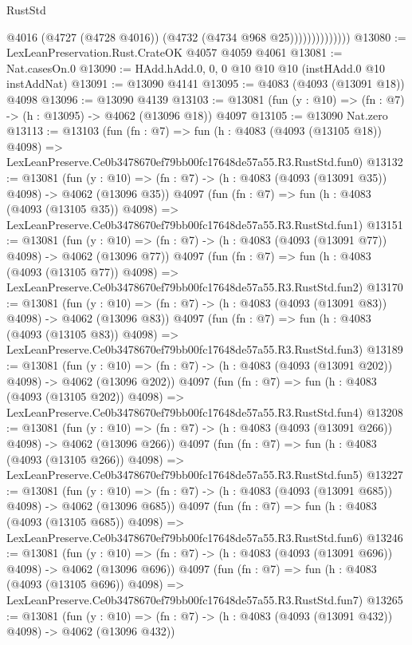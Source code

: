 \begin{lexlean}{RustStd}
\begin{coremodule}
                            @4016
                            (@4727 (@4728 @4016))
                            (@4732 (@4734 @968 @25))))))))))))))
@13080 := LexLeanPreservation.Rust.CrateOK @4057 @4059 @4061
@13081 := Nat.casesOn.{0}
@13090 := HAdd.hAdd.{0, 0, 0} @10 @10 @10 (instHAdd.{0} @10 instAddNat)
@13091 := @13090 @4141
@13095 := @4083 (@4093 (@13091 @18)) @4098
@13096 := @13090 @4139
@13103 := @13081 (fun (y : @10) => (fn : @7) -> (h : @13095) -> @4062 (@13096 @18)) @4097
@13105 := @13090 Nat.zero
@13113 := @13103
    (fun (fn : @7) =>
    fun (h : @4083 (@4093 (@13105 @18)) @4098) =>
    LexLeanPreserve.Ce0b3478670ef79bb00fc17648de57a55.R3.RustStd.fun0)
@13132 := @13081
    (fun (y : @10) => (fn : @7) -> (h : @4083 (@4093 (@13091 @35)) @4098) -> @4062 (@13096 @35))
    @4097
    (fun (fn : @7) =>
    fun (h : @4083 (@4093 (@13105 @35)) @4098) =>
    LexLeanPreserve.Ce0b3478670ef79bb00fc17648de57a55.R3.RustStd.fun1)
@13151 := @13081
    (fun (y : @10) => (fn : @7) -> (h : @4083 (@4093 (@13091 @77)) @4098) -> @4062 (@13096 @77))
    @4097
    (fun (fn : @7) =>
    fun (h : @4083 (@4093 (@13105 @77)) @4098) =>
    LexLeanPreserve.Ce0b3478670ef79bb00fc17648de57a55.R3.RustStd.fun2)
@13170 := @13081
    (fun (y : @10) => (fn : @7) -> (h : @4083 (@4093 (@13091 @83)) @4098) -> @4062 (@13096 @83))
    @4097
    (fun (fn : @7) =>
    fun (h : @4083 (@4093 (@13105 @83)) @4098) =>
    LexLeanPreserve.Ce0b3478670ef79bb00fc17648de57a55.R3.RustStd.fun3)
@13189 := @13081
    (fun (y : @10) => (fn : @7) -> (h : @4083 (@4093 (@13091 @202)) @4098) -> @4062 (@13096 @202))
    @4097
    (fun (fn : @7) =>
    fun (h : @4083 (@4093 (@13105 @202)) @4098) =>
    LexLeanPreserve.Ce0b3478670ef79bb00fc17648de57a55.R3.RustStd.fun4)
@13208 := @13081
    (fun (y : @10) => (fn : @7) -> (h : @4083 (@4093 (@13091 @266)) @4098) -> @4062 (@13096 @266))
    @4097
    (fun (fn : @7) =>
    fun (h : @4083 (@4093 (@13105 @266)) @4098) =>
    LexLeanPreserve.Ce0b3478670ef79bb00fc17648de57a55.R3.RustStd.fun5)
@13227 := @13081
    (fun (y : @10) => (fn : @7) -> (h : @4083 (@4093 (@13091 @685)) @4098) -> @4062 (@13096 @685))
    @4097
    (fun (fn : @7) =>
    fun (h : @4083 (@4093 (@13105 @685)) @4098) =>
    LexLeanPreserve.Ce0b3478670ef79bb00fc17648de57a55.R3.RustStd.fun6)
@13246 := @13081
    (fun (y : @10) => (fn : @7) -> (h : @4083 (@4093 (@13091 @696)) @4098) -> @4062 (@13096 @696))
    @4097
    (fun (fn : @7) =>
    fun (h : @4083 (@4093 (@13105 @696)) @4098) =>
    LexLeanPreserve.Ce0b3478670ef79bb00fc17648de57a55.R3.RustStd.fun7)
@13265 := @13081
    (fun (y : @10) => (fn : @7) -> (h : @4083 (@4093 (@13091 @432)) @4098) -> @4062 (@13096 @432))

\end{coremodule}
\end{lexlean}
